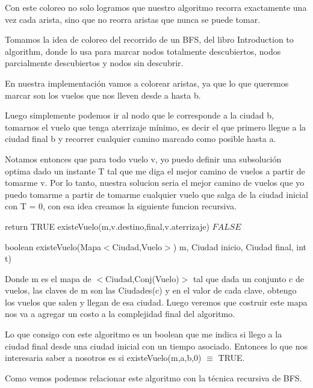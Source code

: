 Con este coloreo no solo logramos que nuestro algoritmo recorra exactamente una vez cada arista, sino que no reorra aristas que nunca se puede tomar.

Tomamos la idea de coloreo del recorrido de un BFS, del libro Introduction to algorithm, donde lo usa para marcar nodos totalmente descubiertos, nodos parcialmente descubiertos y nodos sin descubrir.

En nuestra implementaci\'on vamos a colorear aristas, ya que lo que queremos marcar son los vuelos que nos lleven desde a hasta b.

Luego simplemente podemos ir al nodo que le corresponde a la ciudad b, tomarnos el vuelo que tenga aterrizaje m\'inimo, es decir el que primero llegue a la ciudad final b y recorrer cualquier camino marcado como posible hasta a.

Notamos entonces que para todo vuelo v, yo puedo definir una subsoluci\'on optima dado un instante T tal que me diga el mejor camino de vuelos a partir de tomarme v.
Por lo tanto, nuestra solucion seria el mejor camino de vuelos que yo puedo tomarme a partir de tomarme cualquier vuelo que salga de la ciudad inicial con T = 0, con esa idea creamos la siguiente funcion recursiva.

\begin{algorithm}[H]
\begin{algorithmic}[1]
		\STATE return TRUE
	\ENDIF
        \RETURN existeVuelo(m,v.destino,final,v.aterrizaje)
    \ENDIF
\ENDFOR
\RETURN $FALSE$
\caption{boolean existeVuelo(Mapa$<$Ciudad,Vuelo$>$) m, Ciudad inicio, Ciudad final, int t)}%
\end{algorithmic}
\end{algorithm}

Donde m es el mapa de $<$Ciudad,Conj(Vuelo)$>$ tal que dada un conjunto c de vuelos, las claves de m son las Ciudades(c) y en el valor de cada clave, obtengo los vuelos que salen y llegan de esa ciudad. Luego veremos que costruir este mapa nos va a agregar un costo a la complejidad final del algoritmo.  

Lo que consigo con este algoritmo es un boolean que me indica si llego a la ciudad final desde una ciudad inicial con un tiempo asociado. Entonces lo que nos interesaria saber a nosotros es si existeVuelo(m,a,b,0) $\equiv$ TRUE. 

Como vemos podemos relacionar este algoritmo con la t\'ecnica recursiva de BFS.

